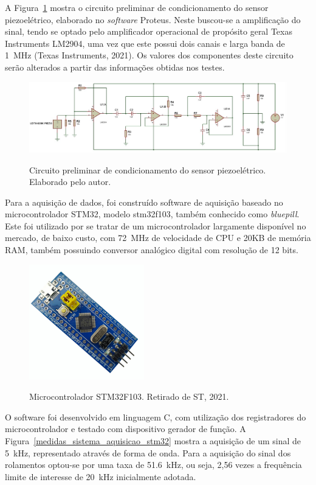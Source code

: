 \documentclass[
	12pt,				
	oneside,			
	a4paper,			
	english,			
	brazil,			
	]{abntex2ppgsi}
\begin{document}
A Figura~\ref{circuito_sensor} mostra o circuito preliminar de condicionamento do sensor piezoelétrico, elaborado no \textit{software} Proteus. Neste buscou-se a amplificação do sinal, tendo se optado pelo amplificador operacional de propósito geral Texas Instruments LM2904, uma vez que este possui dois canais e larga banda de \SI{1}{\mega\hertz} (Texas Instruments, 2021). Os valores dos componentes deste circuito serão alterados a partir das informações obtidas nos testes.

\begin{figure}[H]
\centering
\caption {Circuito preliminar de condicionamento do sensor piezoelétrico. Elaborado pelo autor.}
\includegraphics[width=\textwidth,height=\textheight,keepaspectratio]{circuito_sensor}
\label{circuito_sensor}
\end{figure} 

Para a aquisição de dados, foi construído software de aquisição baseado no microcontrolador STM32, modelo stm32f103, também conhecido como \textit{bluepill}. Este foi utilizado por se tratar de um microcontrolador largamente disponível no mercado, de baixo custo, com \SI{72}{\mega\hertz} de velocidade de CPU e 20KB de memória RAM, também possuindo conversor analógico digital com resolução de 12 bits. 

\begin{figure}[H]
\centering
\caption {Microcontrolador STM32F103. Retirado de ST, 2021.}
\includegraphics[width=\textwidth,height=50mm,keepaspectratio]{stm32}
\label{stm32}
\end{figure}

O software foi desenvolvido em linguagem C, com utilização dos registradores do microcontrolador e testado com dispositivo gerador de função. A Figura~\ref{medidas_sistema_aquisicao_stm32} mostra a aquisição de um sinal de \SI{5}{\kilo\hertz}, representado através de forma de onda. Para a aquisição do sinal dos rolamentos optou-se por uma taxa de \SI{51,6}{\kilo\hertz}, ou seja, 2,56 vezes a frequência limite de interesse de \SI{20}{\kilo\hertz} inicialmente adotada. 
\end{document}
